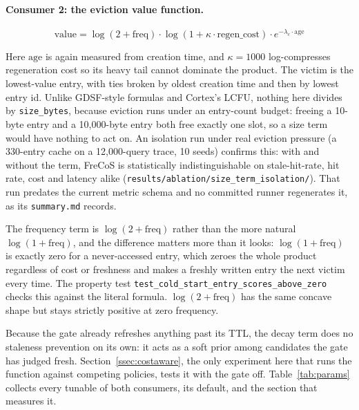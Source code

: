 \documentclass[10pt]{article}
\begin{document}
\paragraph{Consumer 2: the eviction value function.}

\begin{equation}
\text{value} = \log(2 + \text{freq}) \cdot \log(1 + \kappa \cdot \text{regen\_cost}) \cdot e^{-\lambda_c \cdot \text{age}}
\label{eq:value}
\end{equation}

Here $\text{age}$ is again measured from creation time, and $\kappa = 1000$ log-compresses
regeneration cost so its heavy tail cannot dominate the product. The victim is the
lowest-value entry, with ties broken by oldest creation time and then by lowest entry id.
Unlike GDSF-style formulas and Cortex's LCFU, nothing here divides by \texttt{size\_bytes},
because eviction runs under an entry-count budget: freeing a 10-byte entry and a
10{,}000-byte entry both free exactly one slot, so a size term would have nothing to act on. An isolation run under real
eviction pressure (a 330-entry cache on a 12{,}000-query trace, 10 seeds) confirms this: with
and without the term, FreCoS is statistically indistinguishable on stale-hit-rate, hit rate,
cost and latency alike (\texttt{results/ablation/\allowbreak size\_term\_isolation/}). That
run predates the current metric schema and no committed runner regenerates it, as its
\texttt{summary.md} records.

The frequency term is $\log(2+\text{freq})$ rather than the more natural
$\log(1+\text{freq})$, and the difference matters more than it looks:
$\log(1+\text{freq})$ is exactly zero for a never-accessed entry, which zeroes the whole
product regardless of cost or freshness and makes a freshly written entry the next victim
every time. The property test
\texttt{test\_cold\_start\_\allowbreak entry\_scores\_\allowbreak above\_zero} checks this
against the literal formula. $\log(2+\text{freq})$ has the same concave shape but stays
strictly positive at zero frequency.

Because the gate already refreshes anything past its TTL, the decay term does no staleness
prevention on its own: it acts as a soft prior among candidates the gate has judged fresh.
Section~\ref{ssec:costaware}, the only experiment here that runs the function against
competing policies, tests it with the gate off. Table~\ref{tab:params} collects every tunable of both consumers, its
default, and the section that measures it.
\end{document}
